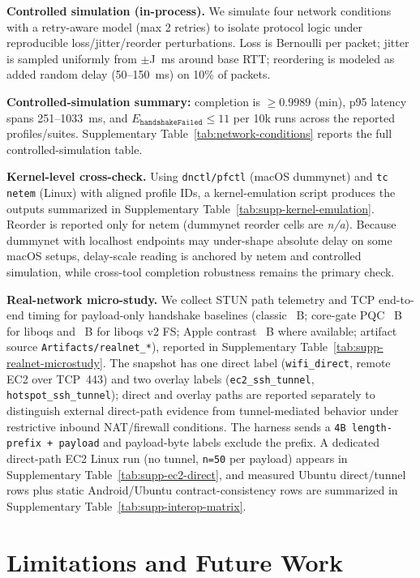 \documentclass[10pt,journal,compsoc]{IEEEtran}
\begin{document}
\textbf{Controlled simulation (in-process).} We simulate four network
conditions with a retry-aware model (max 2 retries) to isolate protocol
logic under reproducible loss/jitter/reorder perturbations. Loss is
Bernoulli per packet; jitter is sampled uniformly from $\pm$J~ms around
base RTT; reordering is modeled as added random delay (50--150~ms) on
10\% of packets.

\textbf{Controlled-simulation summary:} completion is \(\ge 0.9989\)
(min), p95 latency spans 251--1033~ms, and
\(E_{\texttt{handshakeFailed}} \le 11\) per 10k runs across the reported
profiles/suites. Supplementary Table~\ref{tab:network-conditions}
reports the full controlled-simulation table.

\textbf{Kernel-level cross-check.} Using \texttt{dnctl/pfctl} (macOS
dummynet) and \texttt{tc netem} (Linux) with aligned profile IDs, a
kernel-emulation script produces the outputs summarized in Supplementary
Table~\ref{tab:supp-kernel-emulation}. Reorder is reported only for netem
(dummynet reorder cells are \textit{n/a}). Because dummynet with
localhost endpoints may under-shape absolute delay on some macOS setups,
delay-scale reading is anchored by netem and controlled simulation, while
cross-tool completion robustness remains the primary check.

\textbf{Real-network micro-study.} We collect STUN path telemetry and TCP
end-to-end timing for payload-only handshake baselines (classic
\claimClassicPayloadBytes~B; core-gate PQC \claimLiboqsPayloadBytes~B for
liboqs and \claimLiboqsVTwoPayloadBytes~B for liboqs v2 FS; Apple contrast
\claimCryptoKitPayloadBytes~B where available; artifact source
\texttt{Artifacts/realnet\_*}), reported in Supplementary
Table~\ref{tab:supp-realnet-microstudy}. The snapshot has one direct
label (\texttt{wifi\_direct}, remote EC2 over TCP~443) and two overlay
labels (\texttt{ec2\_ssh\_tunnel}, \texttt{hotspot\_ssh\_tunnel});
direct and overlay paths are reported separately to distinguish external
direct-path evidence from tunnel-mediated behavior under restrictive
inbound NAT/firewall conditions. The harness sends a \texttt{4B
length-prefix + payload} and payload-byte labels exclude the prefix. A
dedicated direct-path EC2 Linux run (no tunnel, \texttt{n=50} per
payload) appears in Supplementary Table~\ref{tab:supp-ec2-direct}, and
measured Ubuntu direct/tunnel rows plus static Android/Ubuntu
contract-consistency rows are summarized in Supplementary
Table~\ref{tab:supp-interop-matrix}.

\section{Limitations and Future Work}\label{sec:limitations}
\end{document}

